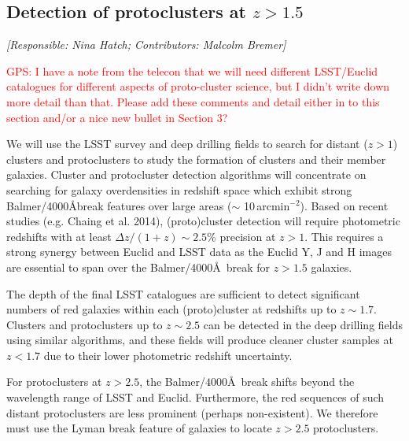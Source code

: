 \documentclass[a4paper,11pt]{article}
\newcommand{\red}{\textcolor{red}}
\begin{document}
\subsection{Detection of protoclusters at $z>1.5$}\label{sec:proto}

{\it [Responsible: Nina Hatch; Contributors: Malcolm Bremer]}

\noindent\red{GPS: I have a note from the telecon that we will need
  different LSST/Euclid catalogues for different aspects of
  proto-cluster science, but I didn't write down more detail than
  that.  Please add these comments and detail either in to this
  section and/or a nice new bullet in Section 3?}

\noindent We will use the LSST survey and deep drilling fields to
search for distant ($z >1$) clusters and protoclusters to study the
formation of clusters and their member galaxies. Cluster and
protocluster detection algorithms will concentrate on searching for
galaxy overdensities in redshift space which exhibit strong
Balmer/4000\AA break features over large areas ($\sim$
10\,arcmin$^{-2}$). Based on recent studies (e.g. Chaing et al. 2014),
(proto)cluster detection will require photometric redshifts with at
least $\Delta z/ (1+z)\sim2.5$\% precision at $z>1$. This requires a
strong synergy between Euclid and LSST data as the Euclid Y, J and H
images are essential to span over the Balmer/4000\AA\ break for
$z>1.5$ galaxies.

The depth of the final LSST catalogues are sufficient to detect
significant numbers of red galaxies within each (proto)cluster at
redshifts up to $z\sim1.7$. Clusters and protoclusters up to
$z\sim2.5$ can be detected in the deep drilling fields using similar
algorithms, and these fields will produce cleaner cluster samples at
$z<1.7$ due to their lower photometric redshift uncertainty.

For protoclusters at $z>2.5$, the Balmer/$4000$\AA\ break shifts
beyond the wavelength range of LSST and Euclid. Furthermore, the red
sequences of such distant protoclusters are less prominent (perhaps
non-existent). We therefore must use the Lyman break feature of
galaxies to locate $z>2.5$ protoclusters.
\end{document}
